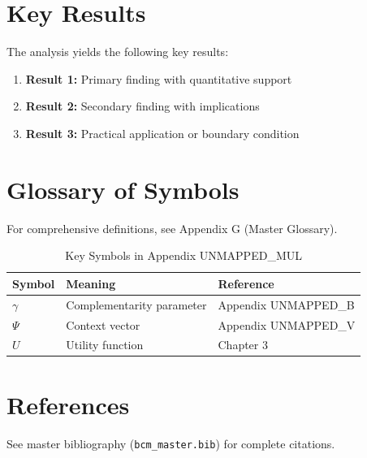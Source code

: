 \section{Key Results}
\label{sec:mul-results}

The analysis yields the following key results:

\begin{enumerate}
    \item \textbf{Result 1:} Primary finding with quantitative support
    \item \textbf{Result 2:} Secondary finding with implications
    \item \textbf{Result 3:} Practical application or boundary condition
\end{enumerate}

\section{Glossary of Symbols}
\label{sec:mul-glossary}

For comprehensive definitions, see Appendix G (Master Glossary).

\begin{table}[htbp]
\centering
\caption{Key Symbols in Appendix UNMAPPED_MUL}
\begin{tabular}{lll}
\toprule
\textbf{Symbol} & \textbf{Meaning} & \textbf{Reference} \\
\midrule
$\gamma$ & Complementarity parameter & Appendix UNMAPPED_B \\
$\Psi$ & Context vector & Appendix UNMAPPED_V \\
$U$ & Utility function & Chapter 3 \\
\bottomrule
\end{tabular}
\end{table}


\section{References}
\label{sec:mul-references}

See master bibliography (\texttt{bcm\_master.bib}) for complete citations.

\nocite{bcm_master}

